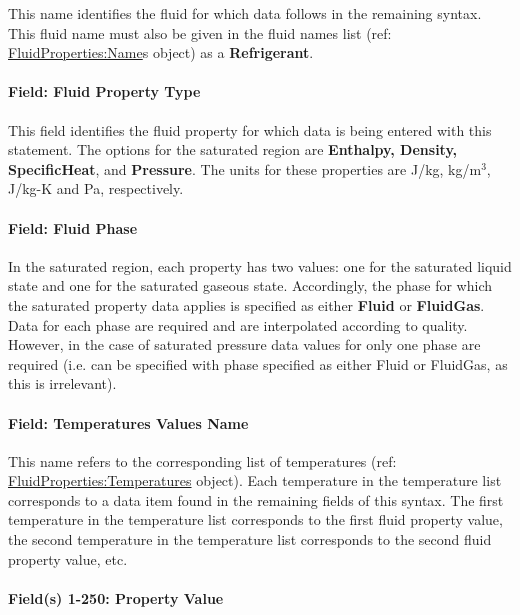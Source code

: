 This name identifies the fluid for which data follows in the remaining syntax. This fluid name must also be given in the fluid names list (ref: \hyperref[fluidpropertiesname]{FluidProperties:Name}s object) as a \textbf{Refrigerant}.

\paragraph{Field: Fluid Property Type}\label{field-fluid-property-type}

This field identifies the fluid property for which data is being entered with this statement. The options for the saturated region are \textbf{Enthalpy, Density, SpecificHeat}, and \textbf{Pressure}. The units for these properties are J/kg, kg/m\(^{3}\), J/kg-K and Pa, respectively.

\paragraph{Field: Fluid Phase}\label{field-fluid-phase}

In the saturated region, each property has two values: one for the saturated liquid state and one for the saturated gaseous state. Accordingly, the phase for which the saturated property data applies is specified as either \textbf{Fluid} or \textbf{FluidGas}. Data for each phase are required and are interpolated according to quality. However, in the case of saturated pressure data values for only one phase are required (i.e. can be specified with phase specified as either Fluid or FluidGas, as this is irrelevant).

\paragraph{Field: Temperatures Values Name}\label{field-temperatures-values-name}

This name refers to the corresponding list of temperatures (ref: \hyperref[fluidpropertiestemperatures]{FluidProperties:Temperatures} object). Each temperature in the temperature list corresponds to a data item found in the remaining fields of this syntax. The first temperature in the temperature list corresponds to the first fluid property value, the second temperature in the temperature list corresponds to the second fluid property value, etc.

\paragraph{Field(s) 1-250: Property Value}\label{fields-1-250-property-value}

